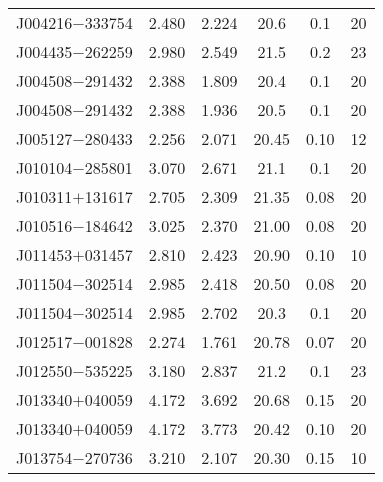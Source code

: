 \begin{table}
\begin{center}
{\begin{tabular}{lccccr}
 J004216$-$333754 &      2.480 &                    2.224 &                    20.6 &                0.1 &                20 \\
 J004435$-$262259 &      2.980 &                    2.549 &                    21.5 &                0.2 &                23 \\
 J004508$-$291432 &      2.388 &                    1.809 &                   20.4  &               0.1  &                20 \\
 J004508$-$291432 &      2.388 &                    1.936 &                   20.5  &               0.1  &                20 \\
 J005127$-$280433 &      2.256 &                    2.071 &                   20.45 &               0.10 &                12 \\
 J010104$-$285801 &      3.070 &                    2.671 &                    21.1 &                0.1 &                20 \\
 J010311$+$131617 &      2.705 &                    2.309 &                   21.35 &               0.08 &                20 \\
 J010516$-$184642 &      3.025 &                    2.370 &                   21.00 &               0.08 &                20 \\
 J011453$+$031457 &      2.810 &                    2.423 &                   20.90 &               0.10 &                10 \\
 J011504$-$302514 &      2.985 &                    2.418 &                   20.50 &               0.08 &                20 \\
 J011504$-$302514 &      2.985 &                    2.702 &                   20.3  &               0.1  &                20 \\
 J012517$-$001828 &      2.274 &                    1.761 &                   20.78 &               0.07 &                20 \\
 J012550$-$535225 &      3.180 &                    2.837 &                    21.2 &                0.1 &                23 \\
 J013340$+$040059 &      4.172 &                    3.692 &                   20.68 &               0.15 &                20 \\
 J013340$+$040059 &      4.172 &                    3.773 &                   20.42 &               0.10 &                20 \\
 J013754$-$270736 &      3.210 &                    2.107 &                   20.30 &               0.15 &                10 \\

\end{tabular}}
\end{center}
\end{table}
